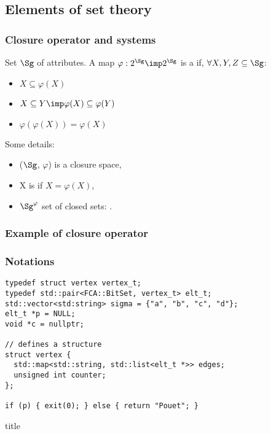 

\subsection{Elements of set theory}

\begin{frame}
\frametitle{Closure operator and systems}

Set $\Sg$ of attributes. A map $\varphi: 2^{\Sg} \imp 2^{\Sg}$ is a 
 if, $\forall X, Y, Z \subseteq \Sg$:
\begin{itemize}
	\item $X \subseteq \varphi(X)$ \quad {}
	\item $X \subseteq Y \imp \varphi(X) \subseteq \varphi(Y)$ 
	\quad {}
	\item $\varphi(\varphi(X)) = \varphi(X)$ \quad {}
\end{itemize}

\vspace{1.2em}

Some details:
\begin{itemize}
	\item ($\Sg$, $\varphi$) is a closure space,
	\item X is  if $X = \varphi(X)$,
	\item $\Sg^\varphi$ set of closed sets: .
\end{itemize}

\end{frame}

\begin{frame}
\frametitle{Example of closure operator}
\end{frame}

\begin{frame}[fragile]
\frametitle{Notations}

\begin{lstlisting}[language=CoreCpp, style=SlideShadow, breaklines=true]
typedef struct vertex vertex_t;
typedef std::pair<FCA::BitSet, vertex_t> elt_t;
std::vector<std:string> sigma = {"a", "b", "c", "d"};
elt_t *p = NULL;
void *c = nullptr;

// defines a structure
struct vertex {
  std::map<std::string, std::list<elt_t *>> edges;
  unsigned int counter;
};

if (p) { exit(0); } else { return "Pouet"; }
\end{lstlisting}

\end{frame}

\begin{frame}{title}

\end{frame}



